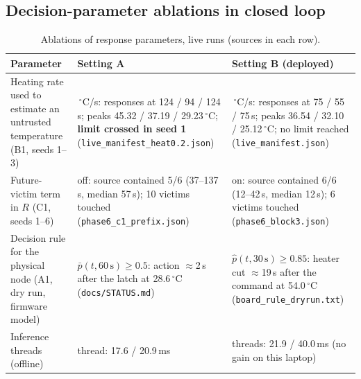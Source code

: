 \documentclass[10pt,a4paper]{article}
\newcommand{\file}[1]{\texttt{#1}}
\newcommand{\degC}{$^{\circ}$C}
\begin{document}
\subsection{Decision-parameter ablations in closed loop}
\begin{table}[ht]
\centering
\caption{Ablations of response parameters, live runs (sources in each row).}
\label{tab:decision}
\small
\begin{tabular}{@{}>{\raggedright\arraybackslash}p{}>{\raggedright\arraybackslash}p{}>{\raggedright\arraybackslash}p{}@{}}
\toprule
Parameter & Setting A & Setting B (deployed) \\
\midrule
Heating rate used to estimate an untrusted temperature (B1, seeds 1--3) & 0.2\,\degC/s: responses at 124 / 94 / 124\,s; peaks 45.32 / 37.19 / 29.23\,\degC; \textbf{limit crossed in seed 1} (\file{live\_manifest\_heat0.2.json}) & 0.3\,\degC/s: responses at 75 / 55 / 75\,s; peaks 36.54 / 32.10 / 25.12\,\degC; no limit reached (\file{live\_manifest.json}) \\
Future-victim term in $R$ (C1, seeds 1--6) & off: source contained 5/6 (37--137\,s, median 57\,s); 10 victims touched (\file{phase6\_c1\_prefix.json}) & on: source contained 6/6 (12--42\,s, median 12\,s); 6 victims touched (\file{phase6\_block3.json}) \\
Decision rule for the physical node (A1, dry run, firmware model) & $\bar p(t,60\,\mathrm{s})\ge 0.5$: action $\approx$2\,s after the latch at 28.6\,\degC{} (\file{docs/STATUS.md}) & $\hat p(t,30\,\mathrm{s})\ge 0.85$: heater cut $\approx$19\,s after the command at 54.0\,\degC{} (\file{board\_rule\_dryrun.txt}) \\
Inference threads (offline) & 1 thread: 17.6 / 20.9\,ms & 4 threads: 21.9 / 40.0\,ms (no gain on this laptop) \\
\bottomrule
\end{tabular}
\end{table}
\end{document}
